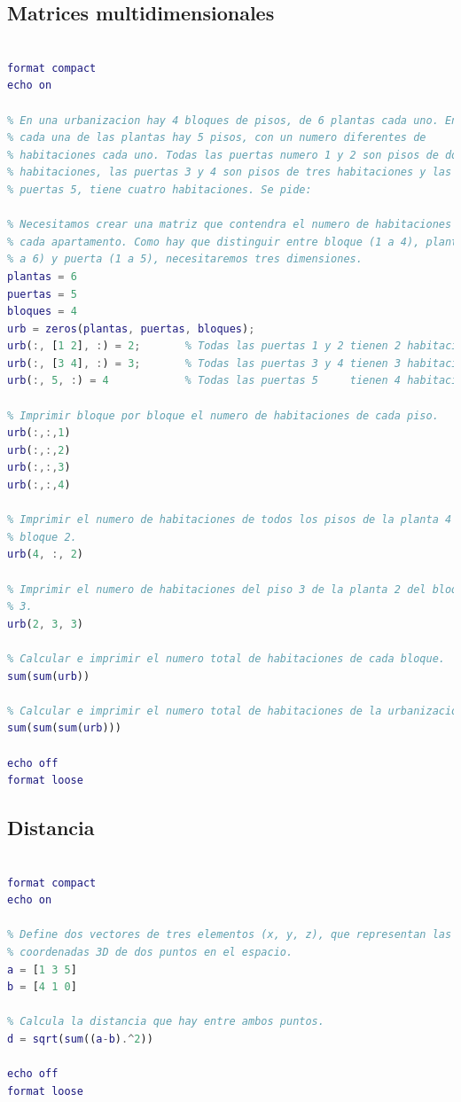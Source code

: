 \subsection{Matrices multidimensionales}
\begin{lstlisting}[language=Matlab]
% Ejercicio 4. Matrices multidimensionales

format compact
echo on

% En una urbanizacion hay 4 bloques de pisos, de 6 plantas cada uno. En
% cada una de las plantas hay 5 pisos, con un numero diferentes de
% habitaciones cada uno. Todas las puertas numero 1 y 2 son pisos de dos
% habitaciones, las puertas 3 y 4 son pisos de tres habitaciones y las
% puertas 5, tiene cuatro habitaciones. Se pide:

% Necesitamos crear una matriz que contendra el numero de habitaciones de
% cada apartamento. Como hay que distinguir entre bloque (1 a 4), planta (1
% a 6) y puerta (1 a 5), necesitaremos tres dimensiones.
plantas = 6
puertas = 5
bloques = 4
urb = zeros(plantas, puertas, bloques);
urb(:, [1 2], :) = 2;       % Todas las puertas 1 y 2 tienen 2 habitaciones
urb(:, [3 4], :) = 3;       % Todas las puertas 3 y 4 tienen 3 habitaciones
urb(:, 5, :) = 4            % Todas las puertas 5     tienen 4 habitaciones

% Imprimir bloque por bloque el numero de habitaciones de cada piso.
urb(:,:,1)
urb(:,:,2)
urb(:,:,3)
urb(:,:,4)

% Imprimir el numero de habitaciones de todos los pisos de la planta 4 del
% bloque 2.
urb(4, :, 2)

% Imprimir el numero de habitaciones del piso 3 de la planta 2 del bloque
% 3.
urb(2, 3, 3)

% Calcular e imprimir el numero total de habitaciones de cada bloque.
sum(sum(urb))

% Calcular e imprimir el numero total de habitaciones de la urbanizacion.
sum(sum(sum(urb)))

echo off
format loose
\end{lstlisting}



\subsection{Distancia}
\begin{lstlisting}[language=Matlab]
% Ejercicio 5. Distancia

format compact
echo on

% Define dos vectores de tres elementos (x, y, z), que representan las
% coordenadas 3D de dos puntos en el espacio.
a = [1 3 5]
b = [4 1 0]

% Calcula la distancia que hay entre ambos puntos.
d = sqrt(sum((a-b).^2))

echo off
format loose
\end{lstlisting}


